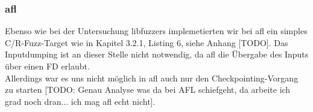 \documentclass[a4paper]{article}
\begin{document}
\subsubsection{afl}
Ebenso wie bei der Untersuchung libfuzzers implemetierten wir bei afl ein simples C/R-Fuzz-Target wie in Kapitel 3.2.1, Listing 6, siehe Anhang [TODO]. Das Inputdumping ist an dieser Stelle nicht notwendig, da afl die Übergabe des Inputs über einen FD erlaubt.\\
Allerdings war es uns nicht möglich in afl auch nur den Checkpointing-Vorgang zu starten [TODO: Genau Analyse was da bei AFL schiefgeht, da arbeite ich grad noch dran... ich mag afl echt nicht].

\end{document}

